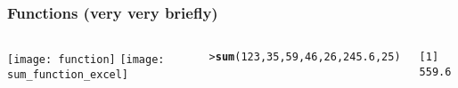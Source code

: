 \documentclass[13pt,aspectratio=169]{beamer}\usepackage[]{graphicx}\usepackage[]{color}
\makeatletter
\newcommand{\hlnum}[1]{\textcolor[rgb]{0.686,0.059,0.569}{#1}}%
\newcommand{\hlstd}[1]{\textcolor[rgb]{0.345,0.345,0.345}{#1}}%
\newcommand{\hlkwd}[1]{\textcolor[rgb]{0.737,0.353,0.396}{\textbf{#1}}}%
\newenvironment{kframe}{%
 \def\at@end@of@kframe{}%
 \ifinner\ifhmode%
  \def\at@end@of@kframe{\end{minipage}}%
  \begin{minipage}{\columnwidth}%
 \fi\fi%
 \def\FrameCommand##1{\hskip\@totalleftmargin \hskip-\fboxsep
 \colorbox{shadecolor}{##1}\hskip-\fboxsep
     \hskip-\linewidth \hskip-\@totalleftmargin \hskip\columnwidth}%
 \MakeFramed {\advance\hsize-\width
   \@totalleftmargin\z@ \linewidth\hsize
   \@setminipage}}%
 {\par\unskip\endMakeFramed%
 \at@end@of@kframe}
\newenvironment{knitrout}{}{} %
\renewenvironment{knitrout}{\setlength{\topsep}{0mm}}{}
\makeatother
\begin{document}
\begin{frame}[fragile]
    \frametitle{Functions (very very briefly)}
    \begin{columns}[t]
	\texttt{[image: function]}
	\texttt{[image: sum\_function\_excel]}\\
\begin{knitrout}\small
{}\color{fgcolor}\begin{kframe}
\begin{alltt}
\hlstd{> }\hlkwd{sum}\hlstd{(}\hlnum{123}\hlstd{,} \hlnum{35}\hlstd{,} \hlnum{59}\hlstd{,} \hlnum{46}\hlstd{,} \hlnum{26}\hlstd{,} \hlnum{245.6}\hlstd{,} \hlnum{25}\hlstd{)}
\end{alltt}
\begin{verbatim}
[1] 559.6
\end{verbatim}
\end{kframe}
\end{knitrout}
    \end{columns}
\end{frame}
\end{document}
